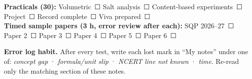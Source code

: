 \documentclass[10pt,a4paper]{extarticle}
\begin{document}
\vspace{4pt}
{\small\textbf{Practicals (30):} Volumetric~☐ \quad Salt analysis~☐ \quad Content-based experiments~☐ \quad Project~☐ \quad Record complete~☐ \quad Viva prepared~☐\\[3pt]
\textbf{Timed sample papers (3 h, error review after each):} SQP 2026--27~☐ \quad Paper 2~☐ \quad Paper 3~☐ \quad Paper 4~☐ \quad Paper 5~☐ \quad Paper 6~☐}
\vspace{2pt}
\begin{tcolorbox}[enhanced,colback=tipY,colframe=tipYframe,boxrule=0.5pt,arc=1.5pt,left=4pt,right=4pt,top=2pt,bottom=2pt]
\small\textbf{Error log habit.} After every test, write each lost mark in ``My notes'' under one of: \emph{concept gap} · \emph{formula/unit slip} · \emph{NCERT line not known} · \emph{time}. Re-read only the matching section of these notes.
\end{tcolorbox}

\begin{tcolorbox}[enhanced,colback=white,colframe=navy,boxrule=0.8pt,arc=2pt,title={\sffamily\bfseries\footnotesize My notes},colbacktitle=navy,coltitle=white,height fill,before skip=4pt]
\end{tcolorbox}
\end{document}
